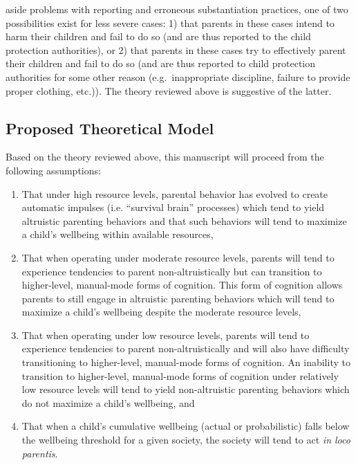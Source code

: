 \documentclass[review]{elsarticle}\usepackage[]{graphicx}\usepackage[]{color}
\begin{document}
aside problems with reporting and erroneous substantiation practices,
one of two possibilities exist for less severe cases: 1) that parents in
these cases intend to harm their children and fail to do so (and are
thus reported to the child protection authorities), or 2) that parents
in these cases try to effectively parent their children and fail to do
so (and are thus reported to child protection authorities for some other
reason (e.g.~inappropriate discipline, failure to provide proper
clothing, etc.)). The theory reviewed above is suggestive of the latter.

\subsection{Proposed Theoretical
Model}\label{proposed-theoretical-model}

Based on the theory reviewed above, this manuscript will proceed from
the following assumptions:

\begin{enumerate}
\def\labelenumi{\arabic{enumi}.}
\itemsep1pt\parskip0pt
\item
  That under high resource levels, parental behavior has evolved to
  create automatic impulses (i.e. ``survival brain'' processes) which
  tend to yield altruistic parenting behaviors and that such behaviors
  will tend to maximize a child's wellbeing within available resources,
\item
  That when operating under moderate resource levels, parents will tend
  to experience tendencies to parent non-altruistically but can
  transition to higher-level, manual-mode forms of cognition. This form
  of cognition allows parents to still engage in altruistic parenting
  behaviors which will tend to maximize a child's wellbeing despite the
  moderate resource levels,
\item
  That when operating under low resource levels, parents will tend to
  experience tendencies to parent non-altruistically and will also have
  difficulty transitioning to higher-level, manual-mode forms of
  cognition. An inability to transition to higher-level, manual-mode
  forms of cognition under relatively low resource levels will tend to
  yield non-altruistic parenting behaviors which do not maximize a
  child's wellbeing, and
\item
  That when a child's cumulative wellbeing (actual or probabilistic)
  falls below the wellbeing threshold for a given society, the society
  will tend to act \emph{in loco parentis}.
\end{enumerate}
\end{document}
